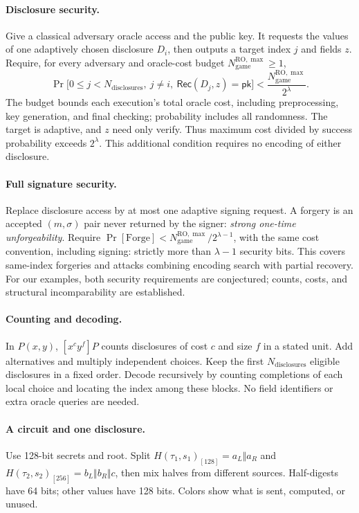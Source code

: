 \documentclass[10pt]{article}
\newcommand{\gamebudget}{N_{\mathrm{game}}^{\mathrm{RO},\max}}
\newcommand{\disclosurecount}{N_{\mathrm{disclosures}}}
\begin{document}
\paragraph{Disclosure security.} Give a classical adversary oracle access and the public key. It requests the values of one adaptively chosen disclosure $D_i$, then outputs a target index $j$ and fields $z$. Require, for every adversary and oracle-cost budget $\gamebudget\ge1$,
\[
 \Pr\bigl[0\le j<\disclosurecount,\ j\ne i,\ \mathsf{Rec}(D_j,z)=\mathsf{pk}\bigr]<\frac{\gamebudget}{2^\lambda}.
\]
The budget bounds each execution's total oracle cost, including preprocessing, key generation, and final checking; probability includes all randomness. The target is adaptive, and $z$ need only verify. Thus maximum cost divided by success probability exceeds $2^\lambda$. This additional condition requires no encoding of either disclosure.

\paragraph{Full signature security.} Replace disclosure access by at most one adaptive signing request. A forgery is an accepted $(m,\sigma)$ pair never returned by the signer: \emph{strong one-time unforgeability}. Require $\Pr[\mathrm{Forge}]<\gamebudget/2^{\lambda-1}$, with the same cost convention, including signing: strictly more than $\lambda-1$ security bits. This covers same-index forgeries and attacks combining encoding search with partial recovery. For our examples, both security requirements are conjectured; counts, costs, and structural incomparability are established.

\paragraph{Counting and decoding.} In $P(x,y)$, $[x^cy^f]P$ counts disclosures of cost $c$ and size $f$ in a stated unit. Add alternatives and multiply independent choices. Keep the first $\disclosurecount$ eligible disclosures in a fixed order. Decode recursively by counting completions of each local choice and locating the index among these blocks. No field identifiers or extra oracle queries are needed.

\paragraph{A circuit and one disclosure.} Use 128-bit secrets and root. Split $H(\tau_1,s_1)_{[128]}=a_L\Vert a_R$ and $H(\tau_2,s_2)_{[256]}=b_L\Vert b_R\Vert c$, then mix halves from different sources. Half-digests have 64 bits; other values have 128 bits. Colors show what is sent, computed, or unused.
\end{document}
